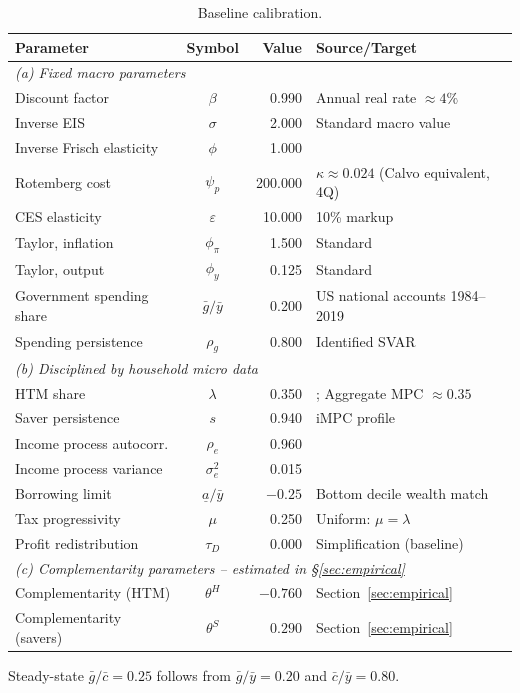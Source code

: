 \begin{table}[ht]
\centering\small
\caption{Baseline calibration.}
\label{tab:calibration}
\begin{threeparttable}
\begin{tabular}{@{}lcrp{6.0cm}@{}}
\toprule
Parameter & Symbol & {Value} & Source/Target \\
\midrule
\multicolumn{4}{l}{\emph{(a) Fixed macro parameters}}\\
Discount factor & $\beta$ & 0.990 & Annual real rate $\approx 4\%$ \\
Inverse EIS & $\sigma$ & 2.000 & Standard macro value \\
Inverse Frisch elasticity & $\phi$ & 1.000 & \citet{Chetty2011} \\
Rotemberg cost & $\psi_{p}$ & 200.000 & $\kappa\approx 0.024$ (Calvo equivalent, 4Q) \\
CES elasticity & $\varepsilon$ & 10.000 & 10\% markup \\
Taylor, inflation & $\phi_{\pi}$ & 1.500 & Standard \\
Taylor, output & $\phi_{y}$ & 0.125 & Standard \\
Government spending share & $\bar g/\bar y$ & 0.200 & US national accounts 1984--2019 \\
Spending persistence & $\rho_{g}$ & 0.800 & Identified SVAR \\
\midrule
\multicolumn{4}{l}{\emph{(b) Disciplined by household micro data}}\\
HTM share & $\lambda$ & 0.350 & \citet{KaplanViolante2014}; Aggregate MPC $\approx 0.35$ \\
Saver persistence & $s$ & 0.940 & iMPC profile \citep{Fagereng2021} \\
Income process autocorr. & $\rho_{e}$ & 0.960 & \citet{FloodenLinde2001} \\
Income process variance & $\sigma_{e}^{2}$ & 0.015 & \citet{FloodenLinde2001} \\
Borrowing limit & $\underline{a}/\bar y$ & $-0.25$ & Bottom decile wealth match \\
Tax progressivity & $\mu$ & 0.250 & Uniform: $\mu=\lambda$ \\
Profit redistribution & $\tau_{D}$ & 0.000 & Simplification (baseline) \\
\midrule
\multicolumn{4}{l}{\emph{(c) Complementarity parameters -- estimated in \S\ref{sec:empirical}}}\\
Complementarity (HTM) & $\theta^{H}$ & $-0.760$ & Section~\ref{sec:empirical} \\
Complementarity (savers) & $\theta^{S}$ & $\phantom{-}0.290$ & Section~\ref{sec:empirical} \\
\bottomrule
\end{tabular}
\begin{tablenotes}\footnotesize
\item Steady-state $\bar g/\bar c=0.25$ follows from $\bar g/\bar y=0.20$ and
$\bar c/\bar y=0.80$.
\end{tablenotes}
\end{threeparttable}
\end{table}

